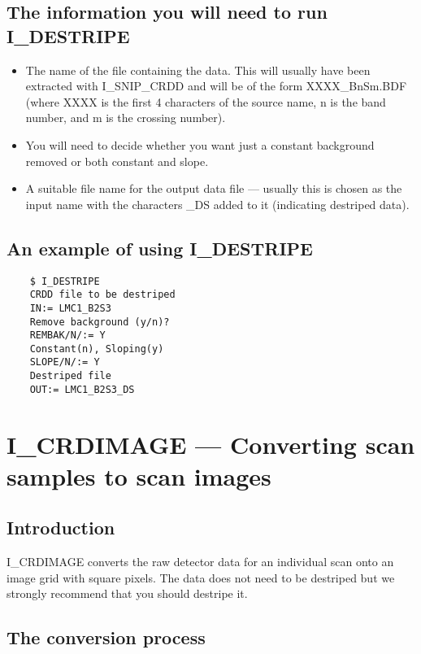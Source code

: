 \subsection {The information you will need to run I\_DESTRIPE}

\begin {itemize}

\item The name of the file containing the data. This will usually have been
extracted with I\_SNIP\_CRDD and will be of the form XXXX\_BnSm.BDF
(where XXXX is the first 4 characters of the source name, n is the band
number, and m is the crossing number).

\item You will need to decide whether you want just a constant background
removed or both constant and slope.

\item A suitable file name for the output data file --- usually this is chosen
as the input name with the characters \_DS added to it (indicating
destriped data).
\end {itemize}

\subsection {An example of using I\_DESTRIPE}

\begin {verbatim}
    $ I_DESTRIPE
    CRDD file to be destriped
    IN:= LMC1_B2S3
    Remove background (y/n)?
    REMBAK/N/:= Y
    Constant(n), Sloping(y)
    SLOPE/N/:= Y
    Destriped file
    OUT:= LMC1_B2S3_DS
\end{verbatim}
\pagebreak

\section{I\_CRDIMAGE --- Converting scan samples to scan images}

\subsection{Introduction}

I\_CRDIMAGE  converts the raw detector data for an individual scan
onto an image grid with square pixels. The data does not need to be destriped
but we strongly recommend that you should destripe it.

\subsection{The conversion process}

